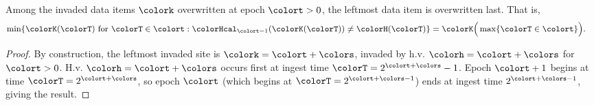 \begin{lemma}
\label{thm:tilted-last-overwritten}
Among the invaded data items $\colork$ overwritten at epoch $\colort > 0$, the leftmost data item is overwritten last.
That is,
\begin{align*}
\min\{ \colorK(\colorT) \text{ for } \colorT \in \colort : \colorHcal_{\colort-1}(\colorK(\colorT)) \neq \colorH(\colorT) \}
&=
\colorK\Big(\max \{ \colorT \in \colort \}\Big).
\end{align*}
\end{lemma}
\begin{proof}
By construction, the leftmost invaded site is $\colork = \colort + \colors$, invaded by h.v. $\colorh = \colort + \colors$ for $\colort > 0$.
H.v. $\colorh = \colort + \colors$ occurs first at ingest time $\colorT = 2^{\colort + \colors} - 1$.
Epoch $\colort + 1$ begins at time $\colorT = 2^{\colort + \colors}$, so epoch $\colort$ (which begins at $\colorT = 2^{\colort + \colors - 1}$) ends at ingest time $2^{\colort + \colors - 1}$, giving the result.
\end{proof}
